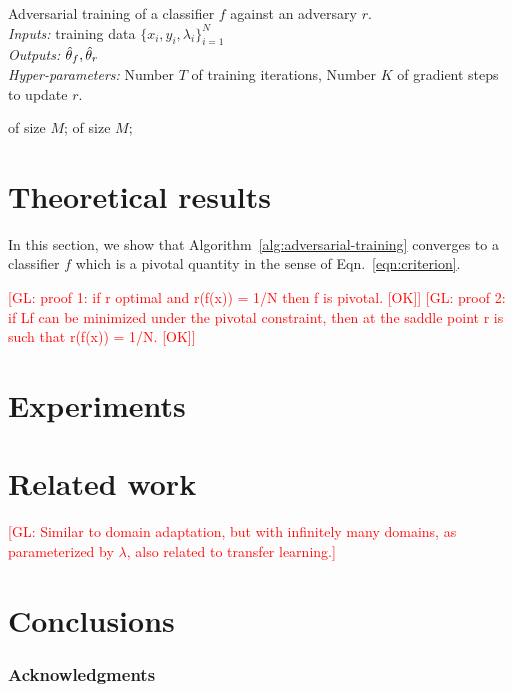 \documentclass{article}
\newcommand{\glnote}[1]{\textcolor{red}{[GL: #1]}}
\theoremstyle{plain}
\begin{document}
\begin{algorithm}[t]
\caption{Adversarial training of a classifier $f$ against an adversary $r$.\\
{\it Inputs:} training data $\{ x_i, y_i, \lambda_i \}_{i=1}^N$\\
{\it Outputs:} $\smash{\hat\theta_f}, \smash{\hat\theta_r}$\\
{\it Hyper-parameters:} Number $T$ of training iterations, Number $K$ of gradient steps to update $r$.}
\label{alg:adversarial-training}
\begin{algorithmic}[1]
         
             of size $M$;
        \EndFor
         of size $M$; 
    \EndFor
\end{algorithmic}
\end{algorithm}


\section{Theoretical results}

In this section, we show that Algorithm~\ref{alg:adversarial-training} converges
to a classifier $f$ which is a pivotal quantity in the sense of Eqn.~\ref{eqn:criterion}.

\glnote{proof 1: if r optimal and r(f(x)) = 1/N then f is pivotal. [OK]}
\glnote{proof 2: if Lf can be minimized under the pivotal constraint, then at the saddle point r is such that r(f(x)) = 1/N. [OK]}

\section{Experiments}

\section{Related work}

\glnote{Similar to domain adaptation, but with infinitely many domains,
as parameterized by $\lambda$, also related to transfer learning.}

\section{Conclusions}

\subsubsection*{Acknowledgments}


{\small
}
\end{document}
